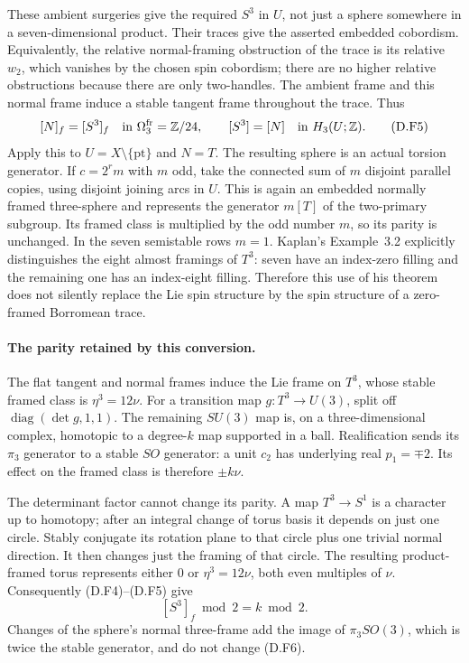 These ambient surgeries give the required $S^3$ in $U$, not just
a sphere somewhere in a seven-dimensional product.  Their
traces give the asserted embedded cobordism.  Equivalently, the
relative normal-framing obstruction of the trace is its relative
$w_2$, which vanishes by the chosen spin cobordism; there are no
higher relative obstructions because there are only two-handles.
The ambient frame and this normal frame induce a stable tangent
frame throughout the trace.  Thus
\[
       [N]_f=[S^3]_f\quad\text{in }\Omega^{\rm fr}_3=\mathbb Z/24,
       \qquad [S^3]=[N]\quad\text{in }H_3(U;\mathbb Z).
 \tag{D.F5}
\]
Apply this to $U=X\setminus\{\mathrm{pt}\}$ and $N=T$.
The resulting sphere is an actual torsion generator.
If $c=2^r m$ with $m$ odd, take the connected sum of $m$
disjoint parallel copies, using disjoint joining arcs in $U$.
This is again an embedded normally framed three-sphere and
represents the generator $m[T]$ of the two-primary subgroup.
Its framed class is multiplied by the odd number $m$, so its
parity is unchanged.  In the seven semistable rows $m=1$.
Kaplan's Example~3.2 explicitly distinguishes the eight almost
framings of $T^3$: seven have an index-zero filling and the
remaining one has an index-eight filling.  Therefore this use of
his theorem does not silently replace the Lie spin structure by
the spin structure of a zero-framed Borromean trace.

\paragraph{The parity retained by this conversion.}
The flat tangent and normal frames induce the Lie frame on
$T^3$, whose stable framed class is $\eta^3=12\nu$.
For a transition map $g:T^3\to U(3)$, split off
$\operatorname{diag}(\det g,1,1)$.  The remaining $SU(3)$ map is,
on a three-dimensional complex, homotopic to a degree-$k$ map
supported in a ball.  Realification sends its $\pi_3$ generator
to a stable $SO$ generator: a unit $c_2$ has underlying real
$p_1=\mp2$.  Its effect on the framed class is therefore
$\pm k\nu$.

The determinant factor cannot change its parity.  A map
$T^3\to S^1$ is a character up to homotopy; after an integral
change of torus basis it depends on just one circle.  Stably
conjugate its rotation plane to that circle plus one trivial
normal direction.  It then changes just the framing of that
circle.  The resulting product-framed torus represents either
$0$ or $\eta^3=12\nu$, both even multiples of $\nu$.
Consequently (D.F4)--(D.F5) give
\[
                   [S^3]_f\bmod2=k\bmod2.
 \tag{D.F6}
\]
Changes of the sphere's normal three-frame add the image of
$\pi_3SO(3)$, which is twice the stable generator, and do not
change (D.F6).

